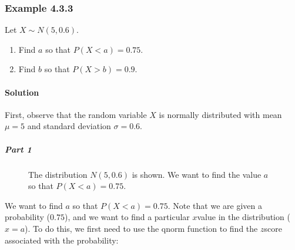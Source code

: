 \documentclass[letterpaper,10pt,english]{jupyterBook}
\begin{document}
\subsubsection{Example 4.3.3}
\label{\detokenize{Ch4 The Normal Distribution and the Central Limit Theorem/4.3 The Normal Distribution and z-scores:example-4-3-3}}
\sphinxAtStartPar
Let \(X \sim N(5, 0.6)\).
\begin{enumerate}
%
\item {} 
\sphinxAtStartPar
Find \(a\) so that \(P(X < a) = 0.75\).

\item {} 
\sphinxAtStartPar
Find \(b\) so that \(P(X > b) = 0.9\).

\end{enumerate}


\paragraph{Solution}
\label{\detokenize{Ch4 The Normal Distribution and the Central Limit Theorem/4.3 The Normal Distribution and z-scores:id5}}
\sphinxAtStartPar
First, observe that the random variable \(X\) is normally distributed with mean \(\mu = 5\) and standard deviation \(\sigma = 0.6\).


\subparagraph{Part 1}
\label{\detokenize{Ch4 The Normal Distribution and the Central Limit Theorem/4.3 The Normal Distribution and z-scores:id6}}
\begin{figure}[htbp]
\centering
\capstart

\noindent{}
\caption{The distribution \(N(5, 0.6)\) is shown. We want to find the value \(a\) so that \(P(X < a) = 0.75\).}\label{\detokenize{Ch4 The Normal Distribution and the Central Limit Theorem/4.3 The Normal Distribution and z-scores:normal-ex6}}\end{figure}

\sphinxAtStartPar
We want to find \(a\) so that \(P(X < a) = 0.75\). Note that we are given a probability (\(0.75\)), and we want to find a particular \(x\)\sphinxhyphen{}value in the distribution (\(x = a\)). To do this, we first need to use the qnorm function to find the \(z\)\sphinxhyphen{}score associated with the probability:
\end{document}

